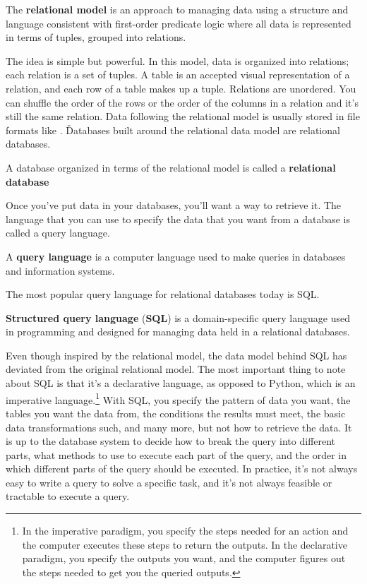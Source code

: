 The \textbf{relational model} is an approach to managing data using a structure and language consistent with first-order
predicate logic where all data is represented in terms of tuples, grouped into relations.
\ed

The idea is simple but powerful. In this model, data is organized into relations; each relation is a set of tuples. A
table is an accepted visual representation of a relation, and each row of a table makes up a tuple. Relations are
unordered. You can shuffle the order of the rows or the order of the columns in a relation and it's still the same
relation. Data following the relational model is usually stored in file formats like . \v

Databases built around the relational data model are relational databases.

A database organized in terms of the relational model is called a \textbf{relational database}
\ed

Once you've put data in your databases, you'll want a way to retrieve it. The language that you can use to specify
the data that you want from a database is called a query language.

A \textbf{query language} is a computer language used to make queries in databases and information systems.
\ed

The most popular query language for relational databases today is SQL.

\textbf{Structured query language} (\textbf{SQL}) is a domain-specific query language used in programming and designed
for managing data held in a relational databases.
\ed

Even though inspired by the relational model, the data model behind SQL has deviated from the original relational
model. The most important thing to note about SQL is that it's a declarative language, as opposed to Python, which is
an imperative language.\footnote{In the imperative paradigm, you specify the steps needed for an action and the
computer executes these steps to return the outputs. In the declarative paradigm, you specify the outputs you want,
and the computer figures out the steps needed to get you the queried outputs.} With SQL, you specify the pattern of
data you want, the tables you want the data from, the conditions the results must meet, the basic data
transformations such, and many more, but not how to retrieve the data. It is up to the database system to decide how
to break the query into different parts, what methods to use to execute each part of the query, and the order in
which different parts of the query should be executed. In practice, it's not always easy to write a query to solve a
specific task, and it's not always feasible or tractable to execute a query.

